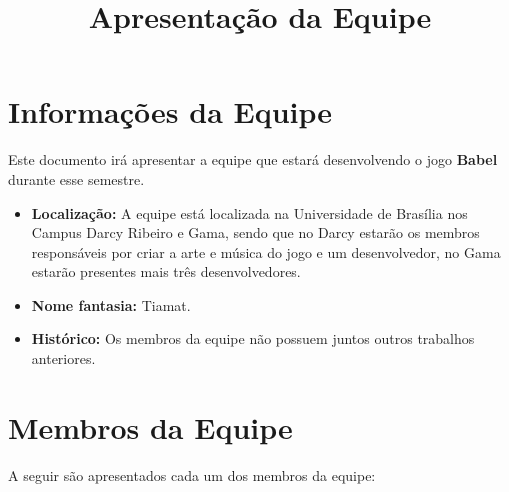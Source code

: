 \documentclass[a4paper, 11pt]{article} %
\title{\textbf{Apresentação da Equipe}} %
\makeatletter
\renewcommand{\maketitle}{ %
\begin{center} %
{\LARGE\@title} %

\vspace{20pt} %

\end{center}
}
\makeatother
\begin{document}
\maketitle %


\section*{Informações da Equipe}

Este documento irá apresentar a equipe que estará desenvolvendo o jogo \textbf{Babel} durante esse semestre.

\begin{itemize}
\item \textbf{Localização:} A equipe está localizada na Universidade de Brasília nos Campus Darcy Ribeiro e Gama, sendo que no Darcy estarão os membros responsáveis por criar a arte e música do jogo e um desenvolvedor, no Gama estarão presentes mais três desenvolvedores.

\item \textbf{Nome fantasia:} Tiamat.
\item \textbf{Histórico:} Os membros da equipe não possuem juntos outros trabalhos anteriores.
\end{itemize}

\section*{Membros da Equipe}

A seguir são apresentados cada um dos membros da equipe:
\end{document}
